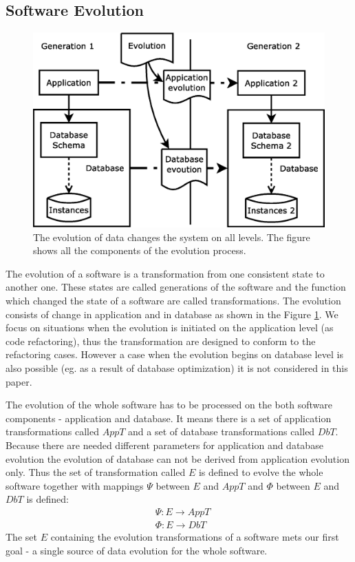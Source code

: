 \documentclass[11pt]{article}
\begin{document}
\subsection{Software Evolution}
\begin{figure}
\centering
	\includegraphics[scale=0.4]{./images/evolution_simple}
	\caption{The evolution of data changes the system on all levels. The figure shows all the components of the evolution process.}
	\label{fig:evolution}
\end{figure}
The evolution of a software is a transformation from one consistent state to another one. These states are called generations of the software and the function which changed the state of a software are called transformations. The evolution consists of change in application and in database as shown in the Figure \ref{fig:evolution}. We focus on situations when the evolution is initiated on the application level (as code refactoring), thus the transformation are designed to conform to the refactoring cases. However a case when the evolution begins on database level is also possible (eg. as a result of database optimization) it is not considered in this paper. 

The evolution of the whole software has to be processed on the both software components - application and database. It means there is a set of application transformations called $AppT$ and a set of database transformations called $DbT$. Because there are needed different parameters for application and database evolution the evolution of database can not be derived from application evolution only. Thus the set of transformation called $E$ is defined to evolve the whole software together with mappings $\Psi$ between $E$ and $AppT$ and $\Phi$ between $E$ and $DbT$ is defined:
\begin{align*}
&	\Psi : E \rightarrow AppT \\
&	\Phi : E \rightarrow DbT
\end{align*}
The set $E$ containing the evolution transformations of a software mets our first goal - a single source of data evolution for the whole software.
\end{document}
